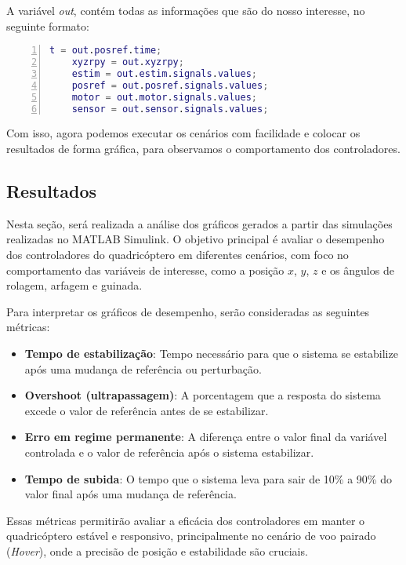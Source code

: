 A variável \textit{out}, contém todas as informações que são do nosso interesse, no seguinte formato:

\begin{lstlisting}[language=Matlab, caption={Exemplo de extração de dados simulados}, numbers=left, backgroundcolor=\color{lightgray}]
	t = out.posref.time;
	xyzrpy = out.xyzrpy;
	estim = out.estim.signals.values;
	posref = out.posref.signals.values;
	motor = out.motor.signals.values;
	sensor = out.sensor.signals.values;
\end{lstlisting}

Com isso, agora podemos executar os cenários com facilidade e colocar os resultados de forma gráfica, para observamos o comportamento dos controladores.

\subsection{Resultados}

Nesta seção, será realizada a análise dos gráficos gerados a partir das simulações realizadas no MATLAB Simulink. O objetivo principal é avaliar o desempenho dos controladores do quadricóptero em diferentes cenários, com foco no comportamento das variáveis de interesse, como a posição \(x\), \(y\), \(z\) e os ângulos de rolagem, arfagem e guinada.

Para interpretar os gráficos de desempenho, serão consideradas as seguintes métricas:
\begin{itemize}
    \item \textbf{Tempo de estabilização}: Tempo necessário para que o sistema se estabilize após uma mudança de referência ou perturbação.
    \item \textbf{Overshoot (ultrapassagem)}: A porcentagem que a resposta do sistema excede o valor de referência antes de se estabilizar.
    \item \textbf{Erro em regime permanente}: A diferença entre o valor final da variável controlada e o valor de referência após o sistema estabilizar.
    \item \textbf{Tempo de subida}: O tempo que o sistema leva para sair de 10\% a 90\% do valor final após uma mudança de referência.
\end{itemize}

Essas métricas permitirão avaliar a eficácia dos controladores em manter o quadricóptero estável e responsivo, principalmente no cenário de voo pairado (\textit{Hover}), onde a precisão de posição e estabilidade são cruciais.

